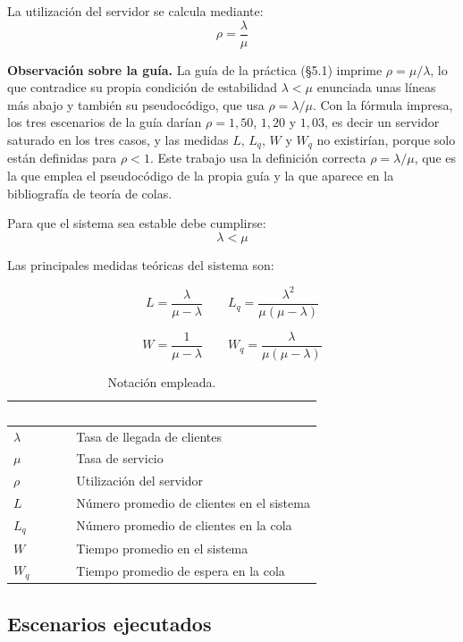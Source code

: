 \documentclass[11pt,a4paper]{article}
\renewcommand{\arraystretch}{1.08}
\begin{document}
La utilización del servidor se calcula mediante:
\[
\rho = \frac{\lambda}{\mu}
\]

\noindent\textbf{Observación sobre la guía.} La guía de la práctica (§5.1) imprime
$\rho = \mu/\lambda$, lo que contradice su propia condición de estabilidad
$\lambda < \mu$ enunciada unas líneas más abajo y también su pseudocódigo, que usa
$\rho = \lambda/\mu$. Con la fórmula impresa, los tres escenarios de la guía darían
$\rho = 1{,}50$, $1{,}20$ y $1{,}03$, es decir un servidor saturado en los tres casos, y
las medidas $L$, $L_q$, $W$ y $W_q$ no existirían, porque solo están definidas para
$\rho < 1$. Este trabajo usa la definición correcta $\rho = \lambda/\mu$, que es la que
emplea el pseudocódigo de la propia guía y la que aparece en la bibliografía de teoría
de colas.

Para que el sistema sea estable debe cumplirse:
\[
\lambda < \mu
\]

Las principales medidas teóricas del sistema son:

\[
L = \frac{\lambda}{\mu-\lambda} \qquad
L_q = \frac{\lambda^2}{\mu(\mu-\lambda)}
\]

\[
W = \frac{1}{\mu-\lambda} \qquad
W_q = \frac{\lambda}{\mu(\mu-\lambda)}
\]

\begin{table}[h!]
\centering
\setlength{\arrayrulewidth}{0.75pt}
\renewcommand{\arraystretch}{1.25}
\begin{tabular}{|l|l|}
\hline
\rowcolor{headerblue}
\textbf{\textcolor{white}{Símbolo}} & \textbf{\textcolor{white}{Significado}} \\ \hline
$\lambda$ & Tasa de llegada de clientes \\ \hline
\rowcolor{rowlight}
$\mu$ & Tasa de servicio \\ \hline
$\rho$ & Utilización del servidor \\ \hline
\rowcolor{rowlight}
$L$ & Número promedio de clientes en el sistema \\ \hline
$L_q$ & Número promedio de clientes en la cola \\ \hline
\rowcolor{rowlight}
$W$ & Tiempo promedio en el sistema \\ \hline
$W_q$ & Tiempo promedio de espera en la cola \\ \hline
\end{tabular}
\caption{Notación empleada.}
\end{table}

\subsection{Escenarios ejecutados}
\end{document}
